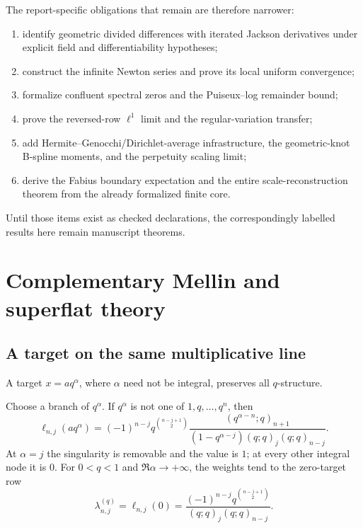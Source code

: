 The report-specific obligations that remain are therefore narrower:
\begin{enumerate}[leftmargin=2em]
\item identify geometric divided differences with iterated Jackson derivatives
under explicit field and differentiability hypotheses;
\item construct the infinite Newton series and prove its local uniform
convergence;
\item formalize confluent spectral zeros and the Puiseux--log remainder bound;
\item prove the reversed-row $\ell^1$ limit and the regular-variation transfer;
\item add Hermite--Genocchi/Dirichlet-average infrastructure, the geometric-knot
B-spline moments, and the perpetuity scaling limit;
\item derive the Fabius boundary expectation and the entire scale-reconstruction
theorem from the already formalized finite core.
\end{enumerate}
Until those items exist as checked declarations, the correspondingly labelled
results here remain manuscript theorems.

\section{Complementary Mellin and superflat theory}
\subsection{A target on the same multiplicative line}

A target $x=aq^\alpha$, where $\alpha$ need not be integral, preserves all
$q$-structure.

\begin{theorem}
\label{g2:thm:general-target}
Choose a branch of $q^\alpha$.  If $q^\alpha$ is not one of
$1,q,\ldots,q^n$, then
\begin{equation}
 \ell_{n,j}(aq^\alpha)
 =(-1)^{n-j}q^{\binom{n-j+1}{2}}
 \frac{(q^{\alpha-n};q)_{n+1}}
 {(1-q^{\alpha-j})(q;q)_j(q;q)_{n-j}}.
 \label{g2:eq:general-target-cardinal}
\end{equation}
At $\alpha=j$ the singularity is removable and the value is $1$; at every
other integral node it is $0$.  For $0<q<1$ and
$\Re\alpha\to+\infty$, the weights tend to the zero-target row
\begin{equation}
 \lambda_{n,j}^{(q)}
 =\ell_{n,j}(0)
 =\frac{(-1)^{n-j}q^{\binom{n-j+1}{2}}}
 {(q;q)_j(q;q)_{n-j}}.
 \label{g2:eq:zero-target-row}
\end{equation}
\end{theorem}

